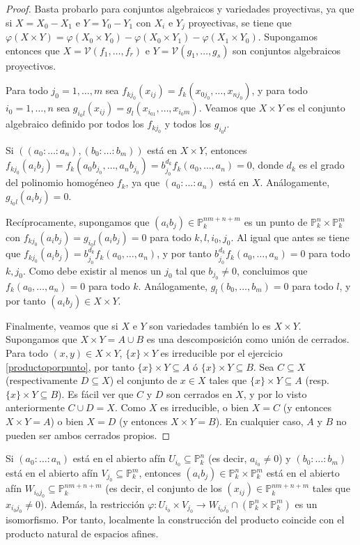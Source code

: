 \documentclass[a4paper,10pt]{book}
\newcommand{\PP}{\mathbb P}
\newcommand{\Pnk}{\PP^n_k}
\newcommand{\Pmk}{\PP^m_k}
\newcommand{\VV}{{\mathcal V}}
\begin{document}
\begin{proof}
 Basta probarlo para conjuntos algebraicos y variedades proyectivas, ya que si $X=X_0-X_1$ e $Y=Y_0-Y_1$ con $X_i$ e $Y_j$ proyectivas, se tiene que $\varphi(X\times Y)=\varphi(X_0\times Y_0)-\varphi(X_0\times Y_1)-\varphi(X_1\times Y_0)$. Supongamos entonces que $X=\VV(f_1,\ldots,f_r)$ e $Y=\VV(g_1,\ldots,g_s)$ son conjuntos algebraicos proyectivos.

Para todo $j_0=1,\ldots,m$ sea $f_{kj_0}(x_{ij})=f_k(x_{0j_0},\ldots,x_{nj_0})$, y para todo $i_0=1,\ldots,n$ sea $g_{i_0l}(x_{ij})=g_l(x_{i_01},\ldots,x_{i_0m})$. Veamos que $X\times Y$ es el conjunto algebraico definido por todos los $f_{kj_0}$ y todos los $g_{i_0l}$. 

Si $((a_0:\ldots:a_n),(b_0:\ldots:b_m))$ está en $X\times Y$, entonces $f_{kj_0}(a_ib_j)=f_k(a_0b_{j_0},\ldots,a_nb_{j_0})=b_{j_0}^{d_k}f_k(a_0,\ldots,a_n)=0$, donde $d_k$ es el grado del polinomio homogéneo $f_k$, ya que $(a_0:\ldots:a_n)$ está en $X$. Análogamente, $g_{i_0l}(a_ib_j)=0$.

Recíprocamente, supongamos que $(a_ib_j)\in\PP^{nm+n+m}_k$ es un punto de $\Pnk\times\Pmk$ con $f_{kj_0}(a_ib_j)=g_{i_0l}(a_ib_j)=0$ para todo $k,l,i_0,j_0$. Al igual que antes se tiene que $f_{kj_0}(a_ib_j)=b_{j_0}^{d_k}f_k(a_0,\ldots,a_n)$, y por tanto $b_{j_0}^{d_k}f_k(a_0,\ldots,a_n)=0$ para todo $k,j_0$. Como debe existir al menos un $j_0$ tal que $b_{j_0}\neq 0$, concluimos que $f_k(a_0,\ldots,a_n)=0$ para todo $k$. Análogamente, $g_l(b_0,\ldots,b_m)=0$ para todo $l$, y por tanto $(a_ib_j)\in X\times Y$.

Finalmente, veamos que si $X$ e $Y$ son variedades también lo es $X\times Y$. Supongamos que $X\times Y=A\cup B$ es una descomposición como unión de cerrados. Para todo $(x,y)\in X\times Y$, $\{x\}\times Y$ es irreducible por el ejercicio \ref{productoporpunto}, por tanto $\{x\}\times Y\subseteq A$ ó $\{x\}\times Y\subseteq B$. Sea $C\subseteq X$ (respectivamente $D\subseteq X$) el conjunto de $x\in X$ tales que $\{x\}\times Y\subseteq A$ (resp. $\{x\}\times Y\subseteq B$). Es fácil ver que $C$ y $D$ son cerrados en $X$, y por lo visto anteriormente $C\cup D=X$. Como $X$ es irreducible, o bien $X=C$ (y entonces $X\times Y=A$) o bien $X=D$ (y entonces $X\times Y=B$). En cualquier caso, $A$ y $B$ no pueden ser ambos cerrados propios.
\end{proof}

Si $(a_0:\ldots:a_n)$ está en el abierto afín $U_{i_0}\subseteq\Pnk$ (es decir, $a_{i_0}\neq 0$) y $(b_0:\ldots:b_m)$ está en el abierto afín $V_{j_0}\subseteq\Pmk$, entonces $(a_ib_j)\in\Pnk\times\Pmk$ está en el abierto afín $W_{i_0j_0}\subseteq\PP^{nm+n+m}_k$ (es decir, el conjunto de los $(x_{ij})\in\PP^{nm+n+m}_k$ tales que $x_{i_0j_0}\neq 0$). Además, la restricción $\varphi:U_{i_0}\times V_{j_0}\to W_{i_0j_0}\cap(\Pnk\times\Pmk)$ es un isomorfismo. Por tanto, localmente la construcción del producto coincide con el producto natural de espacios afines.
\end{document}
